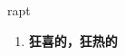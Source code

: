 
\begin{frame}
{\huge rapt}
\begin{center}
\begin{enumerate}\Large
  \item \textbf{狂喜的，狂热的}
\end{enumerate}
\end{center}
\end{frame}
